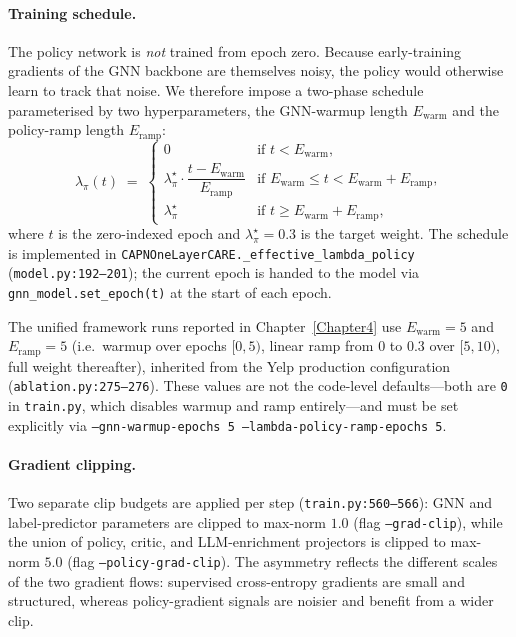 \paragraph{Training schedule.} The policy network is \emph{not} trained from epoch zero. Because early-training gradients of the GNN backbone are themselves noisy, the policy would otherwise learn to track that noise. We therefore impose a two-phase schedule parameterised by two hyperparameters, the GNN-warmup length $E_{\text{warm}}$ and the policy-ramp length $E_{\text{ramp}}$:
\begin{equation}
    \lambda_\pi(t) \;=\;
    \begin{cases}
        0 & \text{if } t < E_{\text{warm}}, \\
        \lambda_\pi^{\star}\cdot \dfrac{t - E_{\text{warm}}}{E_{\text{ramp}}} & \text{if } E_{\text{warm}} \leq t < E_{\text{warm}} + E_{\text{ramp}}, \\
        \lambda_\pi^{\star} & \text{if } t \geq E_{\text{warm}} + E_{\text{ramp}},
    \end{cases}
    \label{eq:lambda-pi-schedule}
\end{equation}
where $t$ is the zero-indexed epoch and $\lambda_\pi^{\star} = 0.3$ is the target weight. The schedule is implemented in \texttt{CAPNOneLayerCARE.\_effective\_lambda\_policy} (\texttt{model.py:192--201}); the current epoch is handed to the model via \texttt{gnn\_model.set\_epoch(t)} at the start of each epoch.

The unified framework runs reported in Chapter~\ref{Chapter4} use $E_{\text{warm}} = 5$ and $E_{\text{ramp}} = 5$ (i.e.\ warmup over epochs $[0, 5)$, linear ramp from $0$ to $0.3$ over $[5, 10)$, full weight thereafter), inherited from the Yelp production configuration (\texttt{ablation.py:275--276}). These values are not the code-level defaults---both are \texttt{0} in \texttt{train.py}, which disables warmup and ramp entirely---and must be set explicitly via \texttt{--gnn-warmup-epochs 5 --lambda-policy-ramp-epochs 5}.

\paragraph{Gradient clipping.} Two separate clip budgets are applied per step (\texttt{train.py:560--566}): GNN and label-predictor parameters are clipped to max-norm $1.0$ (flag \texttt{--grad-clip}), while the union of policy, critic, and LLM-enrichment projectors is clipped to max-norm $5.0$ (flag \texttt{--policy-grad-clip}). The asymmetry reflects the different scales of the two gradient flows: supervised cross-entropy gradients are small and structured, whereas policy-gradient signals are noisier and benefit from a wider clip.

